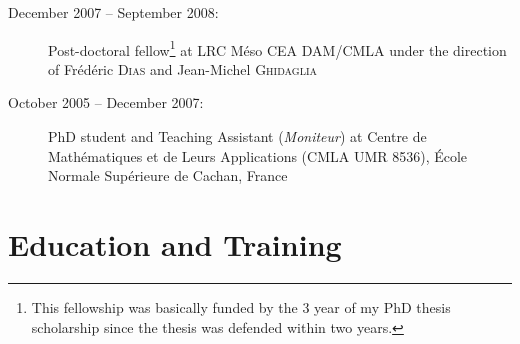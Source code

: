 \documentclass[final, a4paper, oneside, 12pt]{article}
\numberwithin{equation}{section}
\begin{document}
\begin{description}
  \item[December 2007 -- September 2008:] Post-doctoral fellow\footnote{This fellowship was basically funded by the 3 year of my PhD thesis scholarship since the thesis was defended within two years.} at LRC M\'eso CEA DAM/CMLA under the direction of Fr\'ed\'eric \textsc{Dias} and Jean-Michel \textsc{Ghidaglia}
  
  \item[October 2005 -- December 2007:] PhD student and Teaching Assistant (\emph{Moniteur}) at Centre de Math\'ematiques et de Leurs Applications (CMLA UMR 8536), \'Ecole Normale Sup\'erieure de Cachan, France
  
\end{description}


\section{Education and Training}
\end{document}

